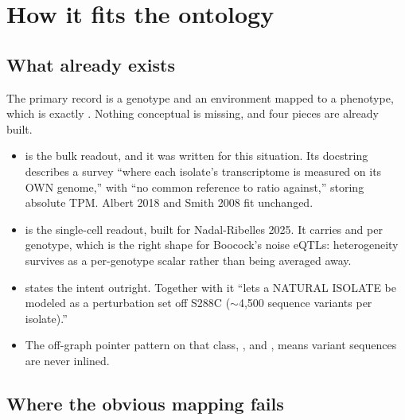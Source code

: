 
\section{How it fits the ontology}\label{sec:ontology}

\subsection{What already exists}

The primary record is a genotype and an environment mapped to a phenotype, which is exactly
. Nothing conceptual is missing, and four pieces are already built.

\begin{itemize}[leftmargin=1.2em,itemsep=2pt,topsep=2pt]
  \item {} is the bulk readout, and it was written for this
    situation. Its docstring describes a survey ``where each isolate's transcriptome is
    measured on its OWN genome,'' with ``no common reference to ratio against,'' storing
    absolute TPM. Albert 2018 and Smith 2008 fit unchanged.
  \item {} is the single-cell readout, built for
    Nadal-Ribelles 2025. It carries  and  per genotype,
    which is the right shape for Boocock's noise eQTLs: heterogeneity survives as a
    per-genotype scalar rather than being averaged away.
  \item {} states the intent outright. Together with
     it ``lets a NATURAL ISOLATE be modeled as a
    perturbation set off S288C ($\sim$4,500 sequence variants per isolate).''
  \item The off-graph pointer pattern on that class, ,
     and , means variant sequences are never
    inlined.
\end{itemize}

\subsection{Where the obvious mapping fails}\label{sec:fails}

